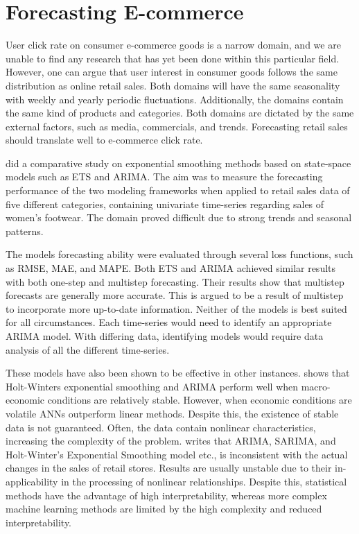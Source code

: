 \section{Forecasting E-commerce}
\label{section:RelatedWork:forecasting-ecommerce}

User click rate on consumer e-commerce goods is a narrow domain,
and we are unable to find any research that has yet been done within this particular field.
However, one can argue that user interest in consumer goods follows the same distribution
as online retail sales.
Both domains will have the same seasonality with weekly and yearly periodic fluctuations.
Additionally, the domains contain the same kind of products and categories.
Both domains are dictated by the same external factors, such as media, commercials,
and trends.
Forecasting retail sales should translate well to e-commerce click rate.


\cite{Ramos2015} did a comparative study on exponential smoothing methods
based on state-space models such as ETS and ARIMA.
The aim was to measure the forecasting performance of the two modeling frameworks
when applied to retail sales data of five different categories,
containing univariate time-series regarding sales of women's footwear.
The domain proved difficult due to strong trends and seasonal patterns.

The models forecasting ability were evaluated through several loss functions, such as RMSE, MAE, and MAPE.
Both ETS and ARIMA achieved similar results with both one-step and multistep forecasting.
Their results show that multistep forecasts are generally more accurate.
This is argued to be a result of multistep to incorporate more up-to-date information.
Neither of the models is best suited for all circumstances.
Each time-series would need to identify an appropriate ARIMA model.
With differing data, identifying models would require data analysis of all the different time-series.



These models have also been shown to be effective in other instances.
\cite{Chu2003} shows that Holt-Winters exponential smoothing and ARIMA perform well when macro-economic
conditions are relatively stable.
However, when economic conditions are volatile ANNs outperform linear methods.
Despite this, the existence of stable data is not guaranteed.
Often, the data contain nonlinear characteristics, increasing the complexity of the problem.
\cite{Weng2020} writes that ARIMA, SARIMA, and Holt-Winter's
Exponential Smoothing model etc., is inconsistent with the actual changes in the sales
of retail stores.
Results are usually unstable due to their in-applicability
in the processing of nonlinear relationships.
Despite this, statistical methods have the advantage of high interpretability,
whereas more complex machine learning methods are limited by the high complexity and reduced interpretability.



